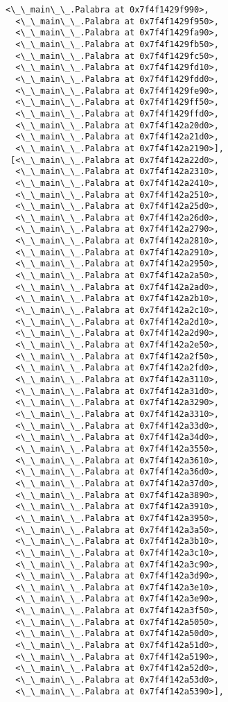 \documentclass[12pt,a4paper,table]{article}
\begin{document}
\begin{tcolorbox}[breakable, size=fbox, boxrule=.5pt, pad at break*=1mm, opacityfill=0]
\begin{Verbatim}[commandchars=\\\{\}]
  <\_\_main\_\_.Palabra at 0x7f4f1429f990>,
  <\_\_main\_\_.Palabra at 0x7f4f1429f950>,
  <\_\_main\_\_.Palabra at 0x7f4f1429fa90>,
  <\_\_main\_\_.Palabra at 0x7f4f1429fb50>,
  <\_\_main\_\_.Palabra at 0x7f4f1429fc50>,
  <\_\_main\_\_.Palabra at 0x7f4f1429fd10>,
  <\_\_main\_\_.Palabra at 0x7f4f1429fdd0>,
  <\_\_main\_\_.Palabra at 0x7f4f1429fe90>,
  <\_\_main\_\_.Palabra at 0x7f4f1429ff50>,
  <\_\_main\_\_.Palabra at 0x7f4f1429ffd0>,
  <\_\_main\_\_.Palabra at 0x7f4f142a20d0>,
  <\_\_main\_\_.Palabra at 0x7f4f142a21d0>,
  <\_\_main\_\_.Palabra at 0x7f4f142a2190>],
 [<\_\_main\_\_.Palabra at 0x7f4f142a22d0>,
  <\_\_main\_\_.Palabra at 0x7f4f142a2310>,
  <\_\_main\_\_.Palabra at 0x7f4f142a2410>,
  <\_\_main\_\_.Palabra at 0x7f4f142a2510>,
  <\_\_main\_\_.Palabra at 0x7f4f142a25d0>,
  <\_\_main\_\_.Palabra at 0x7f4f142a26d0>,
  <\_\_main\_\_.Palabra at 0x7f4f142a2790>,
  <\_\_main\_\_.Palabra at 0x7f4f142a2810>,
  <\_\_main\_\_.Palabra at 0x7f4f142a2910>,
  <\_\_main\_\_.Palabra at 0x7f4f142a2950>,
  <\_\_main\_\_.Palabra at 0x7f4f142a2a50>,
  <\_\_main\_\_.Palabra at 0x7f4f142a2ad0>,
  <\_\_main\_\_.Palabra at 0x7f4f142a2b10>,
  <\_\_main\_\_.Palabra at 0x7f4f142a2c10>,
  <\_\_main\_\_.Palabra at 0x7f4f142a2d10>,
  <\_\_main\_\_.Palabra at 0x7f4f142a2d90>,
  <\_\_main\_\_.Palabra at 0x7f4f142a2e50>,
  <\_\_main\_\_.Palabra at 0x7f4f142a2f50>,
  <\_\_main\_\_.Palabra at 0x7f4f142a2fd0>,
  <\_\_main\_\_.Palabra at 0x7f4f142a3110>,
  <\_\_main\_\_.Palabra at 0x7f4f142a31d0>,
  <\_\_main\_\_.Palabra at 0x7f4f142a3290>,
  <\_\_main\_\_.Palabra at 0x7f4f142a3310>,
  <\_\_main\_\_.Palabra at 0x7f4f142a33d0>,
  <\_\_main\_\_.Palabra at 0x7f4f142a34d0>,
  <\_\_main\_\_.Palabra at 0x7f4f142a3550>,
  <\_\_main\_\_.Palabra at 0x7f4f142a3610>,
  <\_\_main\_\_.Palabra at 0x7f4f142a36d0>,
  <\_\_main\_\_.Palabra at 0x7f4f142a37d0>,
  <\_\_main\_\_.Palabra at 0x7f4f142a3890>,
  <\_\_main\_\_.Palabra at 0x7f4f142a3910>,
  <\_\_main\_\_.Palabra at 0x7f4f142a3950>,
  <\_\_main\_\_.Palabra at 0x7f4f142a3a50>,
  <\_\_main\_\_.Palabra at 0x7f4f142a3b10>,
  <\_\_main\_\_.Palabra at 0x7f4f142a3c10>,
  <\_\_main\_\_.Palabra at 0x7f4f142a3c90>,
  <\_\_main\_\_.Palabra at 0x7f4f142a3d90>,
  <\_\_main\_\_.Palabra at 0x7f4f142a3e10>,
  <\_\_main\_\_.Palabra at 0x7f4f142a3e90>,
  <\_\_main\_\_.Palabra at 0x7f4f142a3f50>,
  <\_\_main\_\_.Palabra at 0x7f4f142a5050>,
  <\_\_main\_\_.Palabra at 0x7f4f142a50d0>,
  <\_\_main\_\_.Palabra at 0x7f4f142a51d0>,
  <\_\_main\_\_.Palabra at 0x7f4f142a5190>,
  <\_\_main\_\_.Palabra at 0x7f4f142a52d0>,
  <\_\_main\_\_.Palabra at 0x7f4f142a53d0>,
  <\_\_main\_\_.Palabra at 0x7f4f142a5390>],

\end{Verbatim}
\end{tcolorbox}
\end{document}
